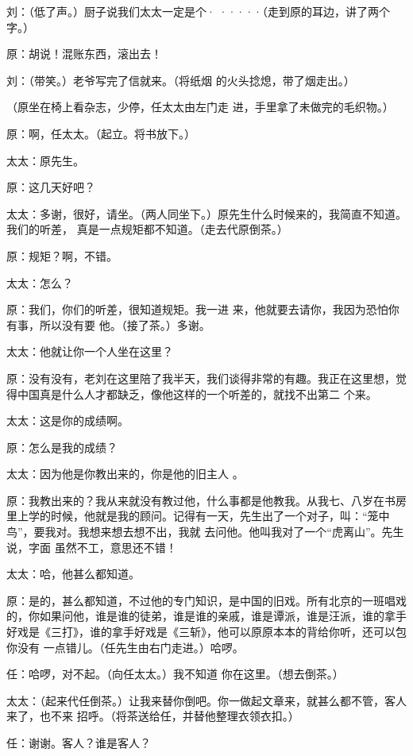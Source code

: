 \documentclass{article}
\begin{document}
刘：（低了声。）厨子说我们太太一定是个·
·····（走到原的耳边，讲了两个字。） 


原：胡说！混账东西，滚出去！ 

\newpage

刘：（带笑。）老爷写完了信就来。（将纸烟
的火头捻熄，带了烟走出。） 

（原坐在椅上看杂志，少停，任太太由左门走
进，手里拿了未做完的毛织物。） 


原：啊，任太太。（起立。将书放下。） 


太太：原先生。 


原：这几天好吧？ 

太太：多谢，很好，请坐。（两人同坐下。）原先生什么时候来的，我简直不知道。我们的听差，
真是一点规矩都不知道。（走去代原倒茶。） 


原：规矩？啊，不错。 


太太：怎么？ 

原：我们，你们的听差，很知道规矩。我一进
\newpage
来，他就要去请你，我因为恐怕你有事，所以没有要
他。（接了茶。）多谢。 


太太：他就让你一个人坐在这里？ 

原：没有没有，老刘在这里陪了我半天，我们谈得非常的有趣。我正在这里想，觉得中国真是什么人才都缺乏，像他这样的一个听差的，就找不出第二
个来。 


太太：这是你的成绩啊。 


原：怎么是我的成绩？ 

太太：因为他是你教出来的，你是他的旧主人
。 

原：我教出来的？我从来就没有教过他，什么事都是他教我。从我七、八岁在书房里上学的时候，他就是我的顾问。记得有一天，先生出了一个对子，叫：“笼中鸟”，要我对。我想来想去想不出，我就
\newpage
去问他。他叫我对了一个“虎离山”。先生说，字面
虽然不工，意思还不错！ 


太太：哈，他甚么都知道。 

原：是的，甚么都知道，不过他的专门知识，是中国的旧戏。所有北京的一班唱戏的，你如果问他，谁是谁的徒弟，谁是谁的亲戚，谁是谭派，谁是汪派，谁的拿手好戏是《三打》，谁的拿手好戏是《三斩》，他可以原原本本的背给你听，还可以包你没有
一点错儿。（任先生由右门走进。）哈啰。 

任：哈啰，对不起。（向任太太。）我不知道
你在这里。（想去倒茶。） 

太太：（起来代任倒茶。）让我来替你倒吧。你一做起文章来，就甚么都不管，客人来了，也不来
招呼。（将茶送给任，并替他整理衣领衣扣。） 


任：谢谢。客人？谁是客人？ 
\end{document}
